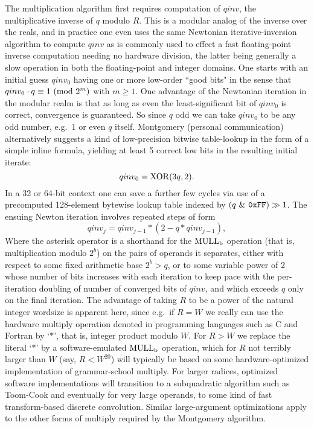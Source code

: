 \documentclass{article}
\begin{document}
The multiplication algorithm first requires computation of $qinv$, the multiplicative inverse of $q$ modulo $R$. This is a modular analog of the inverse over the reals, and in practice one even uses the same Newtonian iterative-inversion algorithm to compute $qinv$ as is commonly used to effect a fast floating-point inverse computation needing no hardware division, the latter being generally a slow operation in both the floating-point and integer domains. One starts with an initial guess $qinv_0$ having one or more low-order ``good bits" in the sense that $qinv_0 \cdot q \equiv 1\ ({\rm mod}\ 2^m)$ with $m \ge 1$. One advantage of the Newtonian iteration in the modular realm is that as long as even the least-significant bit of $qinv_0$ is correct, convergence is guaranteed. So since $q$ odd we can take $qinv_0$ to be any odd number, e.g.~1 or even $q$ itself. Montgomery (personal communication) alternatively suggests a kind of low-precision bitwise table-lookup in the form of a simple inline formula, yielding at least 5 correct low bits in the resulting initial iterate:
\begin{equation}
	qinv_0 = {\rm XOR}(3q, 2) .
\label{qinv0}
\end{equation}
In a 32 or 64-bit context one can save a further few cycles via use of a precomputed 128-element bytewise lookup table indexed by $(q\ \&\ {\tt0xFF})\gg1$. The ensuing Newton iteration involves repeated steps of form
\begin{equation}
	qinv_{j} = qinv_{j-1}*(2 - q*qinv_{j-1}),
\label{newt}
\end{equation}
Where the asterisk operator is a shorthand for the ${\rm MULL_b}$ operation (that is, multiplication modulo $2^b$) on the pairs of operands it separates, either with respect to some fixed arithmetic base $2^b > q$, or to some variable power of 2 whose number of bits increases with each iteration to keep pace with the per-iteration doubling of number of converged bits of $qinv$, and which exceeds $q$ only on the final iteration. The advantage of taking $R$ to be a power of the natural integer wordsize is apparent here, since e.g.~if $R = W$ we really can use the hardware multiply operation denoted in programming languages such as C and Fortran by `$*$', that is, integer product modulo $W$. For $R > W$ we replace the literal `$*$' by a software-emulated ${\rm MULL_b}$ operation, which for $R$ not terribly larger than $W$ (say, $R < W^{20}$) will typically be based on some hardware-optimized implementation of grammar-school multiply. For larger radices, optimized software implementations will transition to a subquadratic algorithm such as Toom-Cook and eventually for very large operands, to some kind of fast transform-based discrete convolution. Similar large-argument optimizations apply to the other forms of multiply required by the Montgomery algorithm.
\end{document}
